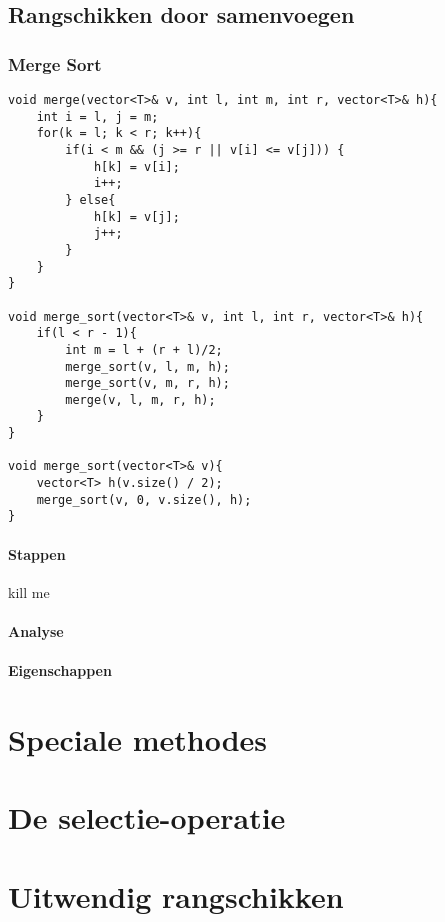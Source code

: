 \documentclass{report}
\begin{document}
\section{Rangschikken door samenvoegen}
\subsection{Merge Sort}
\begin{lstlisting}
void merge(vector<T>& v, int l, int m, int r, vector<T>& h){
    int i = l, j = m;
    for(k = l; k < r; k++){
        if(i < m && (j >= r || v[i] <= v[j])) {
            h[k] = v[i];
            i++;
        } else{
            h[k] = v[j];
            j++;
        }
    }
}

void merge_sort(vector<T>& v, int l, int r, vector<T>& h){
    if(l < r - 1){
        int m = l + (r + l)/2;
        merge_sort(v, l, m, h);
        merge_sort(v, m, r, h);
        merge(v, l, m, r, h);
    }
}

void merge_sort(vector<T>& v){
    vector<T> h(v.size() / 2);
    merge_sort(v, 0, v.size(), h);
}
\end{lstlisting}
\subsubsection{Stappen}
kill me
\subsubsection{Analyse}

\subsubsection{Eigenschappen}


\chapter{Speciale methodes}
\chapter{De selectie-operatie}
\chapter{Uitwendig rangschikken}
\end{document}
